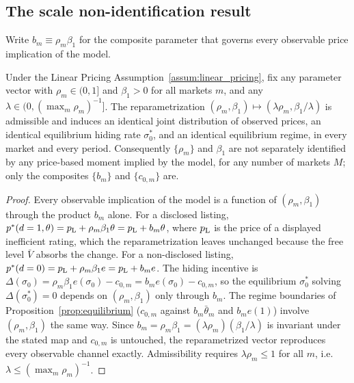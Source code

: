 \subsection*{The scale non-identification result}

Write $b_m\equiv\rho_m\beta_1$ for the composite parameter that governs every observable price
implication of the model.

\begin{proposition}
\label{prop:scale_nonid}
Under the Linear Pricing Assumption~\ref{assum:linear_pricing}, fix any
parameter vector with $\rho_m\in(0,1]$ and $\beta_1>0$ for all markets $m$, and any
$\lambda\in(0,(\max_m\rho_m)^{-1}]$. The reparametrization $(\rho_m,\beta_1)\mapsto
(\lambda\rho_m,\beta_1/\lambda)$ is admissible and induces an identical joint distribution of
observed prices, an identical equilibrium hiding rate $\sigma_0^*$, and an identical
equilibrium regime, in every market and every period. Consequently $\{\rho_m\}$ and $\beta_1$
are not separately identified by any price-based moment implied by the model, for any number of
markets $M$; only the composites $\{b_m\}$ and $\{c_{0,m}\}$ are.
\end{proposition}

\begin{proof}
Every observable implication of the model is a function of $(\rho_m,\beta_1)$ through the
product $b_m$ alone. For a disclosed listing, $p^*(d=1,\theta)=p_{\rm L}+\rho_m\beta_1\theta
=p_{\rm L}+b_m\theta$, where $p_{\rm L}$ is the price of a displayed inefficient rating, which the reparametrization leaves unchanged because the free level $\bar V$ absorbs the change. For a non-disclosed listing, $p^*(d=0)=p_{\rm L}+\rho_m\beta_1
e=p_{\rm L}+b_m e$. The hiding incentive is $\Delta(\sigma_0)=\rho_m\beta_1 e(\sigma_0)-c_{0,m}
=b_m e(\sigma_0)-c_{0,m}$, so the equilibrium $\sigma_0^*$ solving $\Delta(\sigma_0^*)=0$
depends on $(\rho_m,\beta_1)$ only through $b_m$. The regime boundaries of
Proposition~\ref{prop:equilibrium} ($c_{0,m}$ against $b_m\bar\theta_m$ and $b_m e(1)$) involve
$(\rho_m,\beta_1)$ the same way. Since $b_m=\rho_m\beta_1=(\lambda\rho_m)(\beta_1/\lambda)$ is
invariant under the stated map and $c_{0,m}$ is untouched, the reparametrized vector reproduces
every observable channel exactly. Admissibility requires $\lambda\rho_m\le1$ for all $m$, i.e.\
$\lambda\le(\max_m\rho_m)^{-1}$.
\end{proof}

